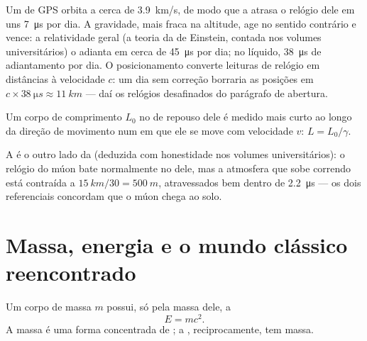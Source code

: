 \begin{remark}\label{rem:g12:special-relativity:gps}
Um  de GPS orbita a cerca de \qty{3.9}{km/s}, de modo que a 
atrasa o relógio dele em uns \qty{7}{\micro s} por dia. A gravidade, mais fraca na
altitude, age no sentido contrário e vence: a relatividade geral (a teoria da 
de Einstein, contada nos volumes universitários) o adianta em cerca de
\qty{45}{\micro s} por dia; no líquido, \qty{38}{\micro s} de adiantamento por dia. O
posicionamento converte leituras de relógio em distâncias à velocidade $c$: um dia sem
correção borraria as posições em $c \times \qty{38}{\micro s} \approx \qty{11}{km}$ ---
daí os relógios desafinados do parágrafo de abertura.
\end{remark}

\begin{proposition}\label{prop:g12:special-relativity:contraction}
Um corpo de comprimento $L_0$ no  de repouso dele é medido mais curto ao longo
da direção de movimento num  em que ele se move com velocidade $v$:
$L = L_0/\gamma$.
\end{proposition}
\admitted

\begin{remark}\label{rem:g12:special-relativity:muonframe}
A  é o outro lado da  (deduzida com
honestidade nos volumes universitários): o relógio do múon bate normalmente no
 dele, mas a atmosfera que sobe correndo está contraída a
$\qty{15}{km}/30 = \qty{500}{m}$, atravessados bem dentro de \qty{2.2}{\micro s} --- os
dois referenciais concordam que o múon chega ao solo.
\end{remark}

\section{Massa, energia e o mundo clássico reencontrado}

\begin{theorem}\label{thm:g12:special-relativity:emc2}
Um corpo de massa $m$ possui, só pela massa dele, a 
\[ E = m c^2 . \]
A massa é uma forma concentrada de ; a , reciprocamente, tem massa.
\end{theorem}
\admitted

